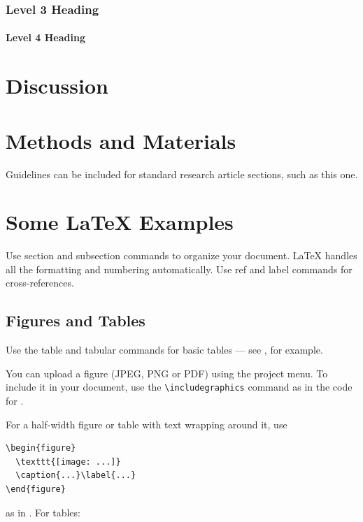 \documentclass[9pt,lineno]{elife}
\begin{document}
\subsubsection{Level 3 Heading}

\lipsum[5]

\paragraph{Level 4 Heading}
\lipsum[7]

\section{Discussion}

\lipsum[9]

\section{Methods and Materials}

Guidelines can be included for standard research article sections, such as this one. 

\lipsum[3]

\section{Some \LaTeX{} Examples}
\label{sec:examples}

Use section and subsection commands to organize your document. \LaTeX{} handles all the formatting and numbering automatically. Use ref and label commands for cross-references.

\subsection{Figures and Tables}

Use the table and tabular commands for basic tables --- see , for example. 

You can upload a figure (JPEG, PNG or PDF) using the project menu. To include it in your document, use the \verb|\includegraphics| command as in the code for . 

For a half-width figure or table with text wrapping around it, use 

\begin{verbatim}
\begin{figure}
  \texttt{[image: ...]}
  \caption{...}\label{...}
\end{figure}
\end{verbatim}
%
as in . For tables:
\end{document}
